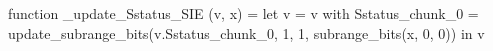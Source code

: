 function _update_Sstatus_SIE (v, x) = let v = { v with Sstatus_chunk_0 = update_subrange_bits(v.Sstatus_chunk_0, 1, 1, subrange_bits(x, 0, 0)) } in
  v
